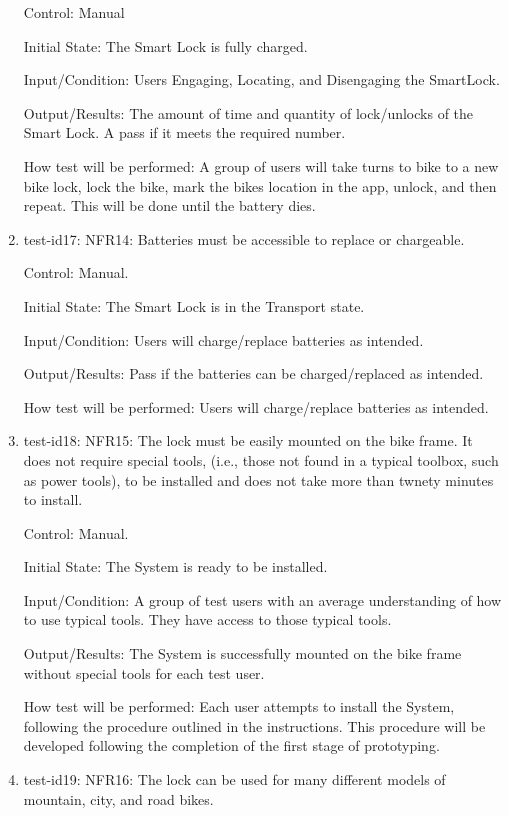 \documentclass[12pt, titlepage]{article}
\begin{document}
\begin{enumerate}
Control: Manual 

Initial State: The Smart Lock is fully charged.

Input/Condition: Users Engaging, Locating, and Disengaging the SmartLock.

Output/Results: The amount of time and quantity of lock/unlocks of the Smart Lock. A pass if it meets the required number.

How test will be performed:  A group of users will take turns to bike to a new bike lock, lock the bike, mark the bikes location in the app, unlock, and then repeat. This will be done until the battery dies.

\item{test-id17: NFR14: Batteries must be accessible to replace or chargeable. \\}

Control: Manual.

Initial State: The Smart Lock is in the Transport state.

Input/Condition: Users will charge/replace batteries as intended.

Output/Results: Pass if the batteries can be charged/replaced as intended.

How test will be performed: Users will charge/replace batteries as intended.

\item{test-id18: NFR15: The lock must be easily mounted on the bike frame. It does not require special tools, (i.e., those not found in a typical toolbox, such as power tools), to be installed and does not take more than twnety minutes to install.  \\}

Control: Manual.

Initial State: The System is ready to be installed.  

Input/Condition: A group of test users with an average understanding of how to use typical tools. They have access to those typical tools. 

Output/Results: The System is successfully mounted on the bike frame without special tools for each test user. 

How test will be performed: Each user attempts to install the System, following the procedure outlined in the instructions. This procedure will be developed following the completion of the first stage of prototyping. 

\item{test-id19: NFR16: The lock can be used for many different models of mountain, city, and road bikes.  \\}


\end{enumerate}
\end{document}
